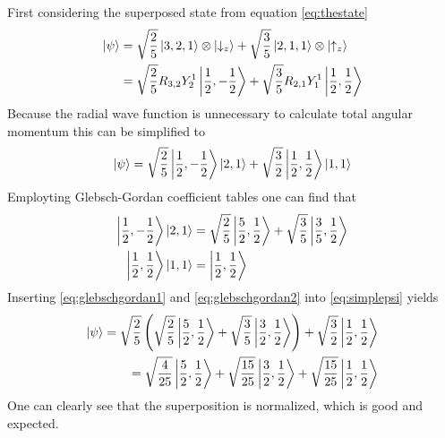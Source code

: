 \documentclass[]{article}
\begin{document}
First considering the superposed state from equation \ref{eq:thestate}
\begin{align*}
\ket{\psi}
&=\sqrt{\frac{2}{5}}\ket{3,2,1}\otimes\ket{\downarrow_z}
+ \sqrt{\frac{3}{5}}\ket{2,1,1}\otimes\ket{\uparrow_z} \\
&=\sqrt{\frac{2}{5}}R_{3,2}Y_2^1\ket{\frac{1}{2},-\frac{1}{2}}
+ \sqrt{\frac{3}{5}}R_{2,1}Y_1^1\ket{\frac{1}{2},\frac{1}{2}}
\end{align*}
Because the radial wave function is unnecessary to calculate total angular momentum this can be simplified to
\begin{equation}
\label{eq:simplepsi}
\ket{\psi}
= \sqrt{\frac{2}{5}}\ket{\frac{1}{2},-\frac{1}{2}}\ket{2,1} 
+ \sqrt{\frac{3}{2}}\ket{\frac{1}{2},\frac{1}{2}}\ket{1,1}
\end{equation}
Employting Glebsch-Gordan coefficient tables one can find that
\begin{align}
\label{eq:glebschgordan1}
\ket{\frac{1}{2},-\frac{1}{2}}\ket{2,1} &=\sqrt{\frac{2}{5}}\ket{\frac{5}{2},\frac{1}{2}}+ \sqrt{\frac{3}{5}}\ket{\frac{3}{5},\frac{1}{2}} \\
\label{eq:glebschgordan2}
\ket{\frac{1}{2},\frac{1}{2}}\ket{1,1} &= \ket{\frac{1}{2},\frac{1}{2}}
\end{align}
Inserting \ref{eq:glebschgordan1} and \ref{eq:glebschgordan2} into \ref{eq:simplepsi} yields
\begin{align*}
\ket{\psi} = \sqrt{\frac{2}{5}}\left(\sqrt{\frac{2}{5}}\ket{\frac{5}{2},\frac{1}{2}} + \sqrt{\frac{3}{5}}\ket{\frac{3}{2},\frac{1}{2}}\right) + \sqrt{\frac{3}{2}}\ket{\frac{1}{2},\frac{1}{2}} \\ = \sqrt{\frac{4}{25}}\ket{\frac{5}{2},\frac{1}{2}} + \sqrt{\frac{15}{25}}\ket{\frac{3}{2},\frac{1}{2}}+\sqrt{\frac{15}{25}}\ket{\frac{1}{2},\frac{1}{2}}
\end{align*}
One can clearly see that the superposition is normalized, which is good and expected.
\end{document}

